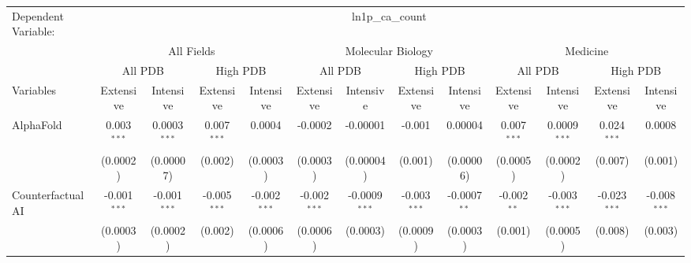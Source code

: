 \begingroup
\centering
\begin{tabular}{lcccccccccccc}
   \tabularnewline \midrule \midrule
   Dependent Variable: & \multicolumn{12}{c}{ln1p\_ca\_count}\\
 & \multicolumn{4}{c}{All Fields} & \multicolumn{4}{c}{Molecular Biology} & \multicolumn{4}{c}{Medicine} \\
\cmidrule(lr){2-5} \cmidrule(lr){6-9} \cmidrule(lr){10-13}
 & \multicolumn{2}{c}{All PDB} & \multicolumn{2}{c}{High PDB} & \multicolumn{2}{c}{All PDB} & \multicolumn{2}{c}{High PDB} & \multicolumn{2}{c}{All PDB} & \multicolumn{2}{c}{High PDB} \\
\cmidrule(lr){2-3} \cmidrule(lr){4-5} \cmidrule(lr){6-7} \cmidrule(lr){8-9} \cmidrule(lr){10-11} \cmidrule(lr){12-13}
Variables & \multicolumn{1}{c}{Extensive} & \multicolumn{1}{c}{Intensive} & \multicolumn{1}{c}{Extensive} & \multicolumn{1}{c}{Intensive} & \multicolumn{1}{c}{Extensive} & \multicolumn{1}{c}{Intensive} & \multicolumn{1}{c}{Extensive} & \multicolumn{1}{c}{Intensive} & \multicolumn{1}{c}{Extensive} & \multicolumn{1}{c}{Intensive} & \multicolumn{1}{c}{Extensive} & \multicolumn{1}{c}{Intensive} \\
\cmidrule(lr){1-1}\cmidrule(lr){2-2} \cmidrule(lr){3-3} \cmidrule(lr){4-4} \cmidrule(lr){5-5} \cmidrule(lr){6-6} \cmidrule(lr){7-7} \cmidrule(lr){8-8} \cmidrule(lr){9-9} \cmidrule(lr){10-10} \cmidrule(lr){11-11} \cmidrule(lr){12-12} \cmidrule(lr){13-13}
   AlphaFold                                & 0.003$^{***}$  & 0.0003$^{***}$   & 0.007$^{***}$  & 0.0004          & -0.0002        & -0.00001         & -0.001         & 0.00004        & 0.007$^{***}$ & 0.0009$^{***}$  & 0.024$^{***}$  & 0.0008\\   
                                            & (0.0002)       & (0.00007)        & (0.002)        & (0.0003)        & (0.0003)       & (0.00004)        & (0.001)        & (0.00006)      & (0.0005)      & (0.0002)        & (0.007)        & (0.001)\\   
   Counterfactual AI                        & -0.001$^{***}$ & -0.001$^{***}$   & -0.005$^{***}$ & -0.002$^{***}$  & -0.002$^{***}$ & -0.0009$^{***}$  & -0.003$^{***}$ & -0.0007$^{**}$ & -0.002$^{**}$ & -0.003$^{***}$  & -0.023$^{***}$ & -0.008$^{***}$\\   
                                            & (0.0003)       & (0.0002)         & (0.002)        & (0.0006)        & (0.0006)       & (0.0003)         & (0.0009)       & (0.0003)       & (0.001)       & (0.0005)        & (0.008)        & (0.003)\\   

\end{tabular}
